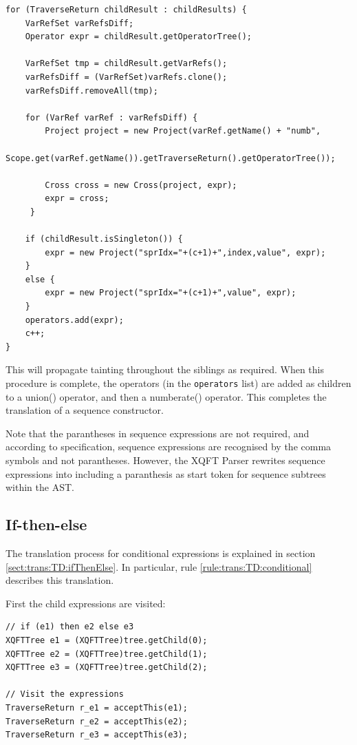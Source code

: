 \begin{Verbatim}
for (TraverseReturn childResult : childResults) {
    VarRefSet varRefsDiff;
    Operator expr = childResult.getOperatorTree();
    
    VarRefSet tmp = childResult.getVarRefs();
    varRefsDiff = (VarRefSet)varRefs.clone();
    varRefsDiff.removeAll(tmp);

    for (VarRef varRef : varRefsDiff) {
        Project project = new Project(varRef.getName() + "numb", 
                Scope.get(varRef.getName()).getTraverseReturn().getOperatorTree());
        
        Cross cross = new Cross(project, expr);
        expr = cross;
     }

    if (childResult.isSingleton()) {
        expr = new Project("sprIdx="+(c+1)+",index,value", expr);
    }
    else {
        expr = new Project("sprIdx="+(c+1)+",value", expr);
    }
    operators.add(expr);
    c++;
}
\end{Verbatim}

This will propagate tainting throughout the siblings as required. When this
procedure is complete, the operators (in the \texttt{operators} list) are
added as children to a \textsf{union()} operator, and then a
\textsf{numberate()} operator. This completes the translation of a sequence
constructor.

Note that the parantheses in sequence expressions are not required, and
according to specification, sequence expressions are recognised by the comma
symbols and not parantheses. However, the XQFT Parser rewrites sequence
expressions into including a paranthesis as start token for sequence subtrees
within the AST.

\subsection{If-then-else}
The translation process for conditional expressions is explained in section
\ref{sect:trans:TD:ifThenElse}. In particular, rule
\ref{rule:trans:TD:conditional} describes this translation. 

First the child expressions are visited:

\begin{Verbatim}
// if (e1) then e2 else e3
XQFTTree e1 = (XQFTTree)tree.getChild(0); 
XQFTTree e2 = (XQFTTree)tree.getChild(1);
XQFTTree e3 = (XQFTTree)tree.getChild(2);
        
// Visit the expressions
TraverseReturn r_e1 = acceptThis(e1);
TraverseReturn r_e2 = acceptThis(e2);
TraverseReturn r_e3 = acceptThis(e3);
\end{Verbatim}

